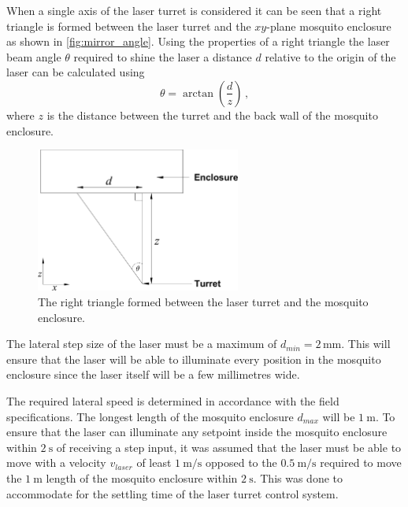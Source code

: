When a single axis of the laser turret is considered it can be seen that a right triangle is formed between the laser turret and the $xy$-plane mosquito enclosure as shown in \autoref{fig:mirror_angle}. Using the properties of a right triangle the laser beam angle $\theta$ required to shine the laser a distance $d$ relative to the origin of the laser can be calculated using
\begin{equation}
  \theta = \arctan{\left(\frac{d}{z}\right)}\,,
  \label{eq:mirror_angle}
\end{equation}
where $z$ is the distance between the turret and the back wall of the mosquito enclosure.
\begin{figure}[!htb]
  \centering
  \includegraphics[width=0.6\textwidth]{figures/hardware_design/mirror_angle.pdf}
  \caption{The right triangle formed between the laser turret and the mosquito enclosure.}
  \label{fig:mirror_angle}
\end{figure}

\newcommand{\requiredLatStepSizeMM}{2}
The lateral step size of the laser must be a maximum of $d_{min} = \requiredLatStepSizeMM$\,mm. This will ensure that the laser will be able to illuminate every position in the mosquito enclosure since the laser itself will be a few millimetres wide.

\newcommand{\requiredLatSpeedMPS}{1}
The required lateral speed is determined in accordance with the field specifications. The longest length of the mosquito enclosure $d_{max}$ will be $\SI{1}{\meter}$. To ensure that the laser can illuminate any setpoint inside the mosquito enclosure within $\SI{2}{\second}$ of receiving a step input, it was assumed that the laser must be able to move with a velocity $v_{laser}$ of least $\SI{\requiredLatSpeedMPS}{\meter\per\second}$ opposed to the $\SI{0.5}{\meter\per\second}$ required to move the $\SI{1}{\meter}$ length of the mosquito enclosure within $\SI{2}{\second}$. This was done to accommodate for the settling time of the laser turret control system.




